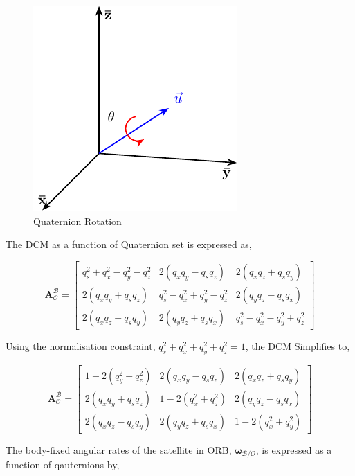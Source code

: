 \begin{figure}[H]
    \centering
    \includegraphics[width=0.3\linewidth]{figures/Quaternion.pdf}
    \caption{Quaternion Rotation}
    \label{fig:3.2}
\end{figure}

\noindent The DCM as a function of Quaternion set is expressed as,

\begin{equation}
    \mathbf{A}_{\mathcal{O}}^{\mathcal{B}} = 
    \begin{bmatrix}
    q_s^2 + q_x^2 - q_y^2 - q_z^2 & 2(q_x q_y - q_s q_z) & 2(q_x q_z + q_s q_y) \\
    2(q_x q_y + q_s q_z) & q_s^2 - q_x^2 + q_y^2 - q_z^2 & 2(q_y q_z - q_s q_x) \\
    2(q_x q_z - q_s q_y) & 2(q_y q_z + q_s q_x) & q_s^2 - q_x^2 - q_y^2 + q_z^2   
    \end{bmatrix}
\end{equation}

\noindent Using the normalisation constraint, $q_s^2 + q_x^2 + q_y^2 + q_z^2 = 1$, the DCM Simplifies to,

\begin{equation}
    \mathbf{A}_{\mathcal{O}}^{\mathcal{B}} = 
    \begin{bmatrix}
    1 - 2(q_y^2 + q_z^2) & 2(q_x q_y - q_s q_z) & 2(q_x q_z + q_s q_y) \\
    2(q_x q_y + q_s q_z) & 1 - 2(q_x^2 + q_z^2) & 2(q_y q_z - q_s q_x) \\
    2(q_x q_z - q_s q_y) & 2(q_y q_z + q_s q_x) & 1 - 2(q_x^2 + q_y^2)   
    \end{bmatrix}
\end{equation}

\noindent The body-fixed angular rates of the satellite in ORB, $\mathbf{\omega}_{\mathcal{B/O}}$, is expressed as a function of qauternions by,

